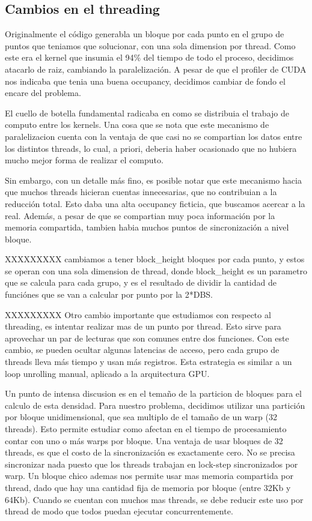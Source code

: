 \subsection{Cambios en el threading}
Originalmente el c\'odigo generabla un bloque por cada punto en el grupo de puntos
que teniamos que solucionar, con una sola dimension por thread.
Como este era el kernel que insumia el 94\% del tiempo de todo el proceso, decidimos
atacarlo de raiz, cambiando la paralelizaci\'on. A pesar de que el profiler de CUDA nos indicaba
que tenia una buena occupancy, decidimos cambiar de fondo el encare del problema.

El cuello de botella fundamental radicaba en como se distribuia el trabajo de computo
entre los kernels. Una cosa que se nota que este mecanismo de paralelizacion cuenta con
la ventaja de que casi no se compartian los datos entre los distintos threads, lo cual,
a priori, deberia haber ocasionado que no hubiera mucho mejor forma de realizar el computo.

Sin embargo, con un detalle m\'as fino, es posible notar que este mecanismo hacia que
muchos threads hicieran cuentas innecesarias, que no contribuian a la reducci\'on total.
Esto daba una alta occupancy ficticia, que buscamos acercar a la real. Adem\'as, a pesar
de que se compartian muy poca informaci\'on por la memoria compartida, tambien habia muchos
puntos de sincronización a nivel bloque.

XXXXXXXXX cambiamos a tener block\_height bloques por cada punto, y estos se operan
con una sola dimension de thread, donde block\_height es un parametro que se calcula
para cada grupo, y es el resultado de dividir la cantidad de funci\'ones que se van
a calcular por punto por la 2*DBS.

XXXXXXXXX Otro cambio importante que estudiamos con respecto al threading, es intentar realizar
mas de un punto por thread. Esto sirve para aprovechar un par de lecturas que son comunes
entre dos funciones. Con este cambio, se pueden ocultar algunas latencias de acceso, pero
cada grupo de threads lleva m\'as tiempo y usan m\'as registros. Esta estrategia es similar
a un loop unrolling manual, aplicado a la arquitectura GPU.

Un punto de intensa discusion es en el tema\~no de la particion de bloques para el calculo
de esta densidad. Para nuestro problema, decidimos utilizar una partici\'on por bloque
unidimensional, que sea multiplo de el tama\~no de un warp (32 threads). Esto permite
estudiar como afectan en el tiempo de procesamiento contar con uno o m\'as warps por
bloque. Una ventaja de usar bloques de 32 threads, es que el costo de la sincronizaci\'on
es exactamente cero. No se precisa sincronizar nada puesto que los threads trabajan
en lock-step sincronizados por warp. Un bloque chico ademas nos permite usar mas memoria compartida
por thread, dado que hay una cantidad fija de memoria por bloque (entre 32Kb y 64Kb).
Cuando se cuentan con muchos mas threads, se debe reducir este uso por thread de modo que
todos puedan ejecutar concurrentemente.

